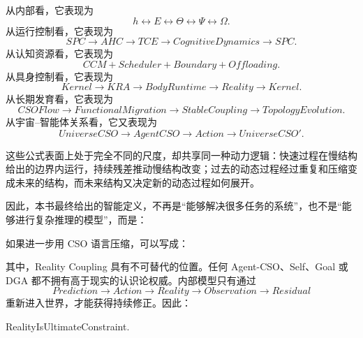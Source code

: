 从内部看，它表现为
\begin{equation}
h
\leftrightarrow
E
\leftrightarrow
\Theta
\leftrightarrow
\Psi
\leftrightarrow
\Omega.
\end{equation}
从运行控制看，它表现为
\begin{equation}
SPC
\rightarrow
AHC
\rightarrow
TCE
\rightarrow
CognitiveDynamics
\rightarrow
SPC.
\end{equation}
从认知资源看，它表现为
\begin{equation}
CCM
+
Scheduler
+
Boundary
+
Offloading.
\end{equation}
从具身控制看，它表现为
\begin{equation}
Kernel
\rightarrow
KRA
\rightarrow
BodyRuntime
\rightarrow
Reality
\rightarrow
Kernel.
\end{equation}
从长期发育看，它表现为
\begin{equation}
CSOFlow
\rightarrow
FunctionalMigration
\rightarrow
StableCoupling
\rightarrow
TopologyEvolution.
\end{equation}
从宇宙--智能体关系看，它又表现为
\begin{equation}
UniverseCSO
\rightarrow
AgentCSO
\rightarrow
Action
\rightarrow
UniverseCSO'.
\end{equation}

这些公式表面上处于完全不同的尺度，却共享同一种动力逻辑：快速过程在慢结构给出的边界内运行，持续残差推动慢结构改变；过去的动态过程经过重复和压缩变成未来的结构，而未来结构又决定新的动态过程如何展开。

因此，本书最终给出的智能定义，不再是“能够解决很多任务的系统”，也不是“能够进行复杂推理的模型”，而是：
\begin{statementbox}
\centering
{}
\end{statementbox}

如果进一步用 CSO 语言压缩，可以写成：
\begin{statementbox}
\centering
{}
\end{statementbox}

其中，Reality Coupling 具有不可替代的位置。任何 Agent-CSO、Self、Goal 或 DGA 都不拥有高于现实的认识论权威。内部模型只有通过
\begin{equation}
Prediction
\rightarrow
Action
\rightarrow
Reality
\rightarrow
Observation
\rightarrow
Residual
\end{equation}
重新进入世界，才能获得持续修正。因此：
\begin{statementbox}
RealityIsUltimateConstraint.
\end{statementbox}

